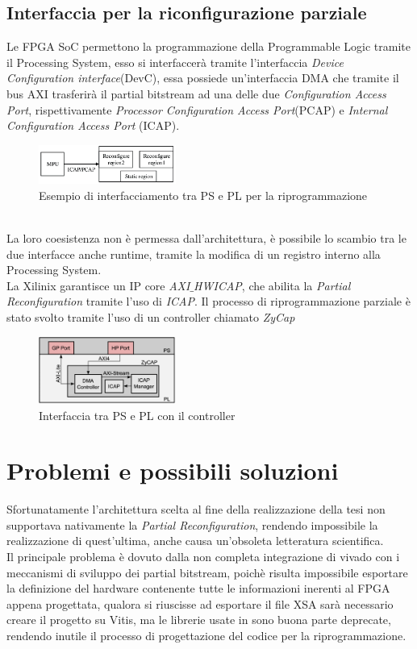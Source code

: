 \subsection{Interfaccia per la riconfigurazione parziale}
Le FPGA SoC permettono la programmazione della Programmable Logic tramite il Processing System, esso si interfaccerà tramite l'interfaccia \textit{Device Configuration interface}(DevC), essa possiede un'interfaccia DMA che tramite il bus AXI trasferirà il partial bitstream ad una delle due \textit{Configuration Access Port}, rispettivamente \textit{Processor Configuration Access Port}(PCAP) e \textit{Internal Configuration Access Port} (ICAP).
\begin{figure}
    \centering
    \includegraphics[width=0.4\textwidth]{images/PRR.png}
    \caption{Esempio di interfacciamento tra PS e PL per la riprogrammazione\cite{PRR2}}
    \label{fig:my_label}
\end{figure}\\
La loro coesistenza non è permessa dall'architettura, è possibile lo scambio tra le due interfacce anche runtime, tramite la modifica di un registro interno alla Processing System.\\
La Xilinix garantisce un IP core \textit{AXI$\_$HWICAP}, che abilita la \textit{Partial Reconfiguration} tramite l'uso di \textit{ICAP}. Il processo di riprogrammazione parziale è stato svolto tramite l'uso di un controller chiamato \textit{ZyCap}\cite{PRR}
\begin{figure}
    \centering
    \includegraphics[width=0.4\textwidth]{images/ZyCap.png}
    \caption{Interfaccia tra PS e PL con il controller}
    \label{fig:my_label}
\end{figure}
\section{Problemi e possibili soluzioni}
Sfortunatamente l'architettura scelta al fine della realizzazione della tesi non supportava nativamente la \textit{Partial Reconfiguration}, rendendo impossibile la realizzazione di quest'ultima, anche causa un'obsoleta letteratura scientifica.\\
Il principale problema è dovuto dalla non completa integrazione di vivado con i meccanismi di sviluppo dei partial bitstream, poichè risulta impossibile esportare la definizione del hardware contenente tutte le informazioni inerenti al FPGA appena progettata, qualora si riuscisse ad esportare il file XSA sarà necessario creare il progetto su Vitis, ma le librerie usate in \cite{PRR} sono buona parte deprecate, rendendo inutile il processo di progettazione del codice per la riprogrammazione.\\
